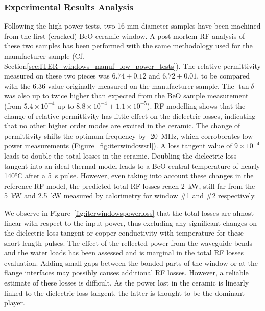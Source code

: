 \subsubsection{Experimental Results Analysis}

Following the high power tests, two 16 mm diameter samples have been machined from the first (cracked) BeO ceramic window. A post-mortem RF analysis of these two samples has been performed with the same methodology used for the manufacturer sample (Cf. Section\ref{sec:ITER_windows_manuf_low_power_tests}). The relative permittivity measured on these two pieces was $6.74\pm0.12$ and $6.72\pm0.01$, to be compared with the 6.36 value originally measured on the manufacturer sample. The $\tan \delta$ was also up to twice higher than expected from the BeO sample measurement (from $5.4\times10^{-4}$ up to $8.8\times10^{-4} \pm 1.1\times 10^{-5}$). RF modelling shows that the change of relative permittivity has little effect on the dielectric losses, indicating that no other higher order modes are excited in the ceramic. The change of permittivity shifts the optimum frequency by -20~MHz, which corroborates low power measurements (Figure~\ref{fig:iterwindowsrl}). A loss tangent value of $9\times10^{-4}$ leads to double the total losses in the ceramic. Doubling the dielectric loss tangent into an ideal thermal model leads to a BeO central temperature of nearly 140$\si{\degreeCelsius}$ after a 5~s pulse. However, even taking into account these changes in the reference RF model, the predicted total RF losses reach 2~kW, still far from the 5~kW and 2.5~kW measured by calorimetry for window \#1 and \#2 respectively. 

We observe in Figure~\ref{fig:iterwindowspowerloss} that the total losses are almost linear with respect to the input power, thus excluding any significant changes on the dielectric loss tangent or copper conductivity with temperature for these short-length pulses.  The effect of the reflected power from the waveguide bends and the water loads has been assessed and is marginal in the total RF losses evaluation. Adding small gaps between the bonded parts of the window or at the flange interfaces may possibly causes additional RF losses. However, a reliable estimate of these losses is difficult. As the power lost in the ceramic is linearly linked to the dielectric loss tangent, the latter is thought to be the dominant player.


